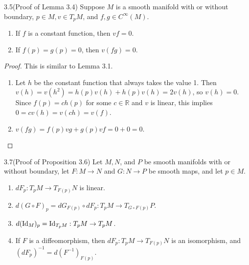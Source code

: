 \begin{customexer}{3.5(Proof of Lemma 3.4)}
  Suppose $M$ is a smooth manifold with or without boundary, $p \in M, v \in T_pM$, and $f, g \in C^{\infty}(M)$.
  \begin{enumerate}[label=(\alph*)]
    \item 
      If $f$ is a constant function, then $vf = 0$.
    \item
      If $f(p) = g(p) = 0$, then $v(fg) = 0$.
  \end{enumerate}
\end{customexer}

\begin{proof}
  This is similar to Lemma 3.1.
  \begin{enumerate}[label=(\alph*)]
    \item
      Let $h$ be the constant function that always takes the value 1.
      Then $v(h) = v(h^2) = h(p)v(h) + h(p)v(h) = 2v(h)$, so $v(h) = 0$.
      Since $f(p) = ch(p)$ for some $c \in \mathbb{R}$ and $v$ is linear, this implies $0 = cv(h) = v(ch) = v(f)$.
    \item
      $v(fg) = f(p)vg + g(p)vf = 0 + 0 = 0$.
  \end{enumerate}
\end{proof}

\begin{customexer}{3.7(Proof of Proposition 3.6)}\label{proof_prop_3_6}
  Let $M, N$, and $P$ be smooth manifolds with or without boundary, let $F: M \rightarrow N$ and $G: N \rightarrow P$ be smooth maps, and let $p \in M$.
  \begin{enumerate}[label=(\alph*)]
    \item
      $dF_p:T_pM \rightarrow T_{F(p)}N$ is linear.
    \item
      $d(G \circ F)_p = dG_{F(p)} \circ dF_p: T_pM \rightarrow T_{G \circ F(p)} P$.
    \item
      $d(\operatorname{Id}_M)_p = \operatorname{Id}_{T_pM}: T_pM \rightarrow T_pM$.
    \item
      If $F$ is a diffeomorphism, then $dF_p: T_pM \rightarrow T_{F(p)}N$ is an isomorphism, and $(dF_p)^{-1} = d(F^{-1})_{F(p)}$.
  \end{enumerate}
\end{customexer}

